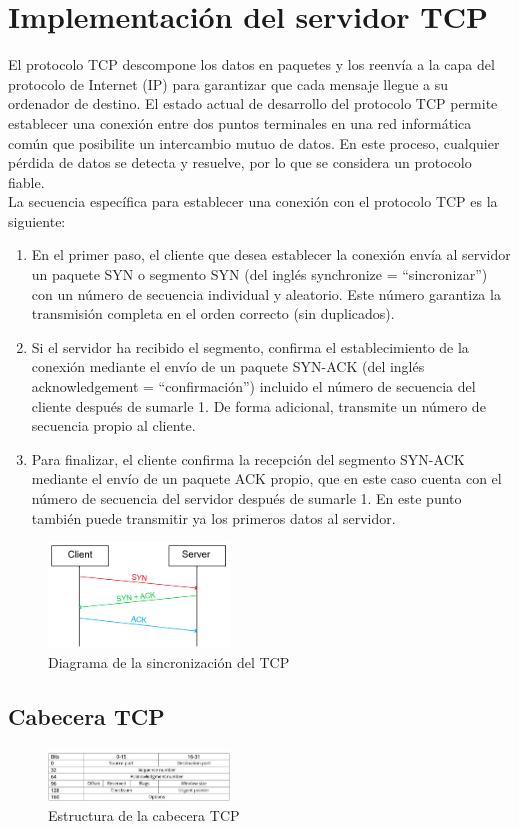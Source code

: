 \documentclass[letterpaper, 10 pt, conference]{ieeeconf}  %
\begin{document}
\section{Implementación del servidor TCP}

El protocolo TCP descompone los datos en paquetes y los reenvía a la capa del protocolo de Internet (IP) para garantizar que cada mensaje llegue a su ordenador de destino. El estado actual de desarrollo del protocolo TCP permite establecer una conexión entre dos puntos terminales en una red informática común que posibilite un intercambio mutuo de datos. En este proceso, cualquier pérdida de datos se detecta y resuelve, por lo que se considera un protocolo fiable. \\

La secuencia específica para establecer una conexión con el protocolo TCP es la siguiente:

\begin{enumerate}
	\item En el primer paso, el cliente que desea establecer la conexión envía al servidor un paquete SYN o segmento SYN (del inglés synchronize = “sincronizar”) con un número de secuencia individual y aleatorio. Este número garantiza la transmisión completa en el orden correcto (sin duplicados).
	\item Si el servidor ha recibido el segmento, confirma el establecimiento de la conexión mediante el envío de un paquete SYN-ACK (del inglés acknowledgement = “confirmación”) incluido el número de secuencia del cliente después de sumarle 1. De forma adicional, transmite un número de secuencia propio al cliente.
	\item Para finalizar, el cliente confirma la recepción del segmento SYN-ACK mediante el envío de un paquete ACK propio, que en este caso cuenta con el número de secuencia del servidor después de sumarle 1. En este punto también puede transmitir ya los primeros datos al servidor.
\end{enumerate}

\begin{figure}[H]
	\centering
	\includegraphics[width=0.43\textwidth]{./Imagenes/tcp_ack.png}
	\caption{Diagrama de la sincronización del TCP}
	\label{fig:tcp_ack}
\end{figure}

\subsection{Cabecera TCP}

\begin{figure}[H]
	\centering
	\includegraphics[width=0.43\textwidth]{./Imagenes/TPC_header.png}
	\caption{Estructura de la cabecera TCP}
	\label{fig:tcp_header}
\end{figure}
\end{document}
